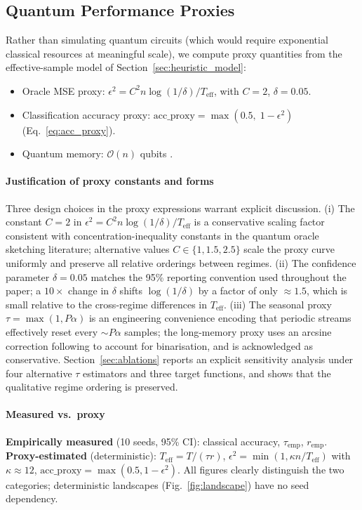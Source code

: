 \documentclass[preprint,12pt,authoryear]{elsarticle}
\newcommand{\bigO}{\mathcal{O}}
\newcommand{\Teff}{T_{\mathrm{eff}}}
\begin{document}
\subsection{Quantum Performance Proxies}
\label{sec:quantum_proxies}

Rather than simulating quantum circuits (which would require exponential classical resources at meaningful scale), we compute proxy quantities from the effective-sample model of Section~\ref{sec:heuristic_model}:
\begin{itemize}
    \item Oracle MSE proxy: $\epsilon^2 = C^2 n \log(1/\delta) / \Teff$, with $C = 2$, $\delta = 0.05$.
    \item Classification accuracy proxy: $\mathrm{acc\_proxy} = \max(0.5,\; 1 - \epsilon^2)$ (Eq.~\ref{eq:acc_proxy}).
    \item Quantum memory: $\bigO(n)$ qubits \citep{zhao2026exponential}.
\end{itemize}

\paragraph{Justification of proxy constants and forms} Three design choices in the proxy expressions warrant explicit discussion.
(i) The constant $C = 2$ in $\epsilon^2 = C^2 n \log(1/\delta) / \Teff$ is a conservative scaling factor consistent with concentration-inequality constants in the quantum oracle sketching literature; alternative values $C \in \{1, 1.5, 2.5\}$ scale the proxy curve uniformly and preserve all relative orderings between regimes.
(ii) The confidence parameter $\delta = 0.05$ matches the 95\% reporting convention used throughout the paper; a $10\times$ change in $\delta$ shifts $\log(1/\delta)$ by a factor of only ${\approx}1.5$, which is small relative to the cross-regime differences in $\Teff$.
(iii) The seasonal proxy $\tau = \max(1, P\alpha)$ is an engineering convenience encoding that periodic streams effectively reset every ${\sim}P\alpha$ samples; the long-memory proxy uses an arcsine correction following \citet{beran1994statistics} to account for binarisation, and is acknowledged as conservative. Section~\ref{sec:ablations} reports an explicit sensitivity analysis under four alternative $\tau$ estimators and three target functions, and shows that the qualitative regime ordering is preserved.

\paragraph{Measured vs.\ proxy} \textbf{Empirically measured} (10 seeds, 95\% CI): classical accuracy, $\tau_{\text{emp}}$, $r_{\text{emp}}$. \textbf{Proxy-estimated} (deterministic): $\Teff = T/(\tau r)$, $\epsilon^2 = \min(1, \kappa n/\Teff)$ with $\kappa \approx 12$, $\mathrm{acc\_proxy} = \max(0.5, 1-\epsilon^2)$. All figures clearly distinguish the two categories; deterministic landscapes (Fig.~\ref{fig:landscape}) have no seed dependency.
\end{document}
